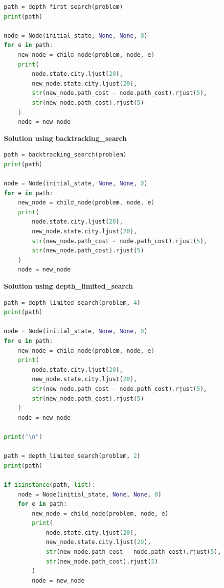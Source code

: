\begin{lstlisting}[language=Python]
path = depth_first_search(problem)
print(path)

node = Node(initial_state, None, None, 0)
for e in path:
    new_node = child_node(problem, node, e)
    print(
        node.state.city.ljust(20), 
        new_node.state.city.ljust(20), 
        str(new_node.path_cost - node.path_cost).rjust(5), 
        str(new_node.path_cost).rjust(5)
    )
    node = new_node
\end{lstlisting}


{\centering \textbf{Solution using backtracking\_search} \par}

\begin{lstlisting}[language=Python]
path = backtracking_search(problem)
print(path)

node = Node(initial_state, None, None, 0)
for e in path:
    new_node = child_node(problem, node, e)
    print(
        node.state.city.ljust(20), 
        new_node.state.city.ljust(20), 
        str(new_node.path_cost - node.path_cost).rjust(5), 
        str(new_node.path_cost).rjust(5)
    )
    node = new_node
\end{lstlisting}



{\centering \textbf{Solution using depth\_limited\_search} \par}

\begin{lstlisting}[language=Python]
path = depth_limited_search(problem, 4)
print(path)

node = Node(initial_state, None, None, 0)
for e in path:
    new_node = child_node(problem, node, e)
    print(
        node.state.city.ljust(20), 
        new_node.state.city.ljust(20), 
        str(new_node.path_cost - node.path_cost).rjust(5), 
        str(new_node.path_cost).rjust(5)
    )
    node = new_node

print("\n")

path = depth_limited_search(problem, 2)
print(path)

if isinstance(path, list):
    node = Node(initial_state, None, None, 0)
    for e in path:
        new_node = child_node(problem, node, e)
        print(
            node.state.city.ljust(20), 
            new_node.state.city.ljust(20), 
            str(new_node.path_cost - node.path_cost).rjust(5), 
            str(new_node.path_cost).rjust(5)
        )
        node = new_node
\end{lstlisting}



